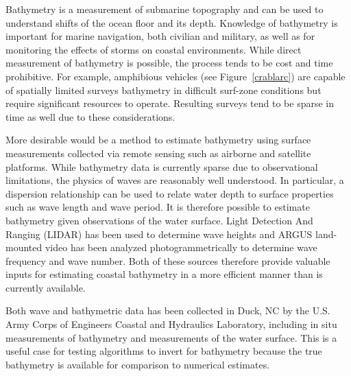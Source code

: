 Bathymetry is a measurement of submarine topography and can be used to understand shifts of the ocean floor and its depth. Knowledge of bathymetry is important for marine navigation, both civilian and military, as well as for monitoring the effects of storms on coastal environments. While direct measurement of bathymetry is possible, the process tends to be cost and time prohibitive. For example, amphibious vehicles (see Figure~\ref{crablarc}) are capable of spatially limited surveys bathymetry in difficult surf-zone conditions but require significant resources to operate. Resulting surveys tend to be sparse in time as well due to these considerations. 

More desirable would be a method to estimate bathymetry using surface measurements collected via remote sensing such as airborne and satellite platforms. While bathymetry data is currently sparse due to observational limitations, the physics of waves are reasonably well understood. In particular, a dispersion relationship can be used to relate water depth to surface properties such as wave length and wave period. It is therefore possible to estimate bathymetry given observations of the water surface. Light Detection And Ranging (LIDAR) has been used to determine wave heights and ARGUS land-mounted video has been analyzed photogrammetrically to determine wave frequency and wave number. Both of these sources therefore provide valuable inputs for estimating coastal bathymetry in a more efficient manner than is currently available.


Both wave and bathymetric data has been collected in Duck, NC by the U.S. Army Corps of Engineers Coastal and Hydraulics Laboratory, including in situ measurements of bathymetry and measurements of the water surface. This is a useful case for testing algorithms to invert for bathymetry because the true bathymetry is available for comparison to numerical estimates.





